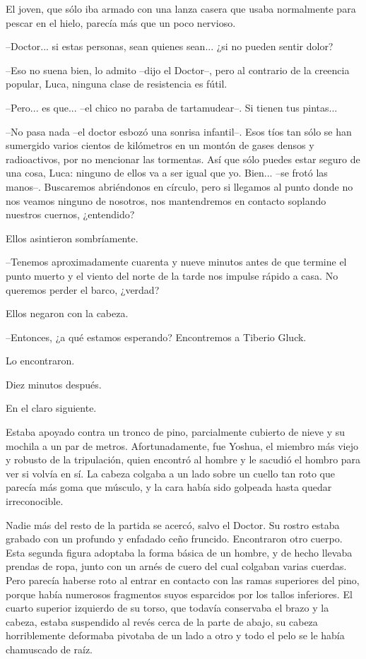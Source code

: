 El joven, que sólo iba armado con una lanza casera que usaba normalmente para pescar en el hielo, parecía más que un poco nervioso.
 
--Doctor... si estas personas, sean quienes sean... ¿si no pueden sentir dolor?
 
--Eso no suena bien, lo admito --dijo el Doctor--, pero al contrario de la creencia popular, Luca, ninguna clase de resistencia es fútil.
 
--Pero... es que... --el chico no paraba de tartamudear--. Si tienen tus pintas...
 
--No pasa nada --el doctor esbozó una sonrisa infantil--. Esos tíos tan sólo se han sumergido varios cientos de kilómetros en un montón de gases densos y radioactivos, por no mencionar las tormentas. Así que sólo puedes estar seguro de una cosa, Luca: ninguno de ellos va a ser igual que yo. Bien... --se frotó las manos--. Buscaremos abriéndonos en círculo, pero si llegamos al punto donde no nos veamos ninguno de nosotros, nos mantendremos en contacto soplando nuestros cuernos, ¿entendido?
 
Ellos asintieron sombríamente.
 
--Tenemos aproximadamente cuarenta y nueve minutos antes de que termine el punto muerto y el viento del norte de la tarde nos impulse rápido a casa. No queremos perder el barco, ¿verdad?
 
Ellos negaron con la cabeza.
 
--Entonces, ¿a qué estamos esperando? Encontremos a Tiberio Gluck.
 
Lo encontraron.
 
Diez minutos después.
 
En el claro siguiente.
 
Estaba apoyado contra un tronco de pino, parcialmente cubierto de nieve y su mochila a un par de metros. Afortunadamente, fue Yoshua, el miembro más viejo y robusto de la tripulación, quien encontró al hombre y le sacudió el hombro para ver si volvía en sí. La cabeza colgaba a un lado sobre un cuello tan roto que parecía más goma que músculo, y la cara había sido golpeada hasta quedar irreconocible.
 
Nadie más del resto de la partida se acercó, salvo el Doctor. Su rostro estaba grabado con un profundo y enfadado ceño fruncido. Encontraron otro cuerpo. Esta segunda figura adoptaba la forma básica de un hombre, y de hecho llevaba prendas de ropa, junto con un arnés de cuero del cual colgaban varias cuerdas. Pero parecía haberse roto al entrar en contacto con las ramas superiores del pino, porque había numerosos fragmentos suyos esparcidos por los tallos inferiores. El cuarto superior izquierdo de su torso, que todavía conservaba el brazo y la cabeza,  estaba suspendido al revés cerca de la parte de abajo, su cabeza horriblemente deformaba pivotaba de un lado a otro y todo el pelo se le había chamuscado de raíz.
 

